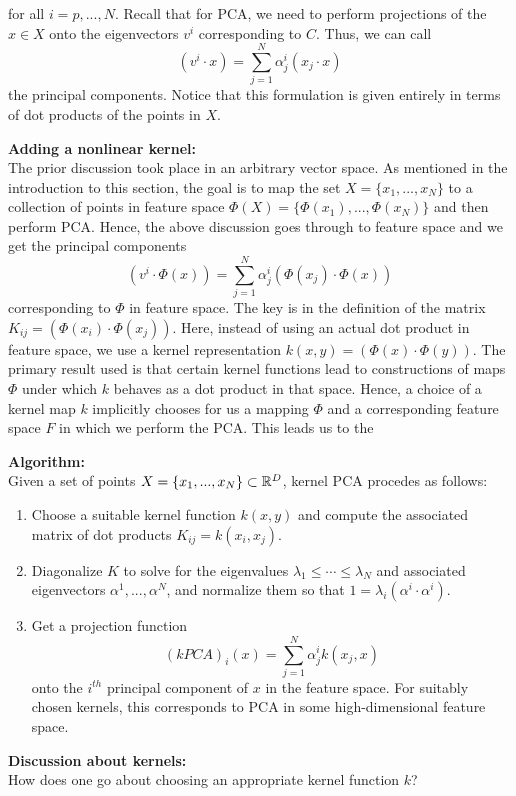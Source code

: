 \documentclass{gtpart}
\theoremstyle{definition}
\begin{document}
for all $i = p, ..., N$. Recall that for PCA, we need to perform projections of the $x \in X$ onto the eigenvectors $v^i$ corresponding to $C$. Thus, we can call $$(v^i \cdot x) = \sum_{j=1}^N \alpha_j^i(x_j \cdot x)$$ the principal components. Notice that this formulation is given entirely in terms of dot products of the points in $X$.

{\bf Adding a nonlinear kernel:}\\
The prior discussion took place in an arbitrary vector space. As mentioned in the introduction to this section, the goal is to map the set $X = \{x_1, ..., x_N\}$ to a collection of points in feature space $\Phi(X) = \{\Phi(x_1), ..., \Phi(x_N)\}$ and then perform PCA. Hence, the above discussion goes through to feature space and we get the principal components $$(v^i \cdot \Phi(x)) = \sum_{j=1}^N \alpha_j^i(\Phi(x_j) \cdot \Phi(x))$$ corresponding to $\Phi$ in feature space. The key is in the definition of the matrix $K_{ij} = (\Phi(x_i) \cdot \Phi(x_j))$. Here, instead of using an actual dot product in feature space, we use a kernel representation $k(x, y) = (\Phi(x) \cdot \Phi(y))$. The primary result used is that certain kernel functions lead to constructions of maps $\Phi$ under which $k$ behaves as a dot product in that space. Hence, a choice of a kernel map $k$ implicitly chooses for us a mapping $\Phi$ and a corresponding feature space $F$ in which we perform the PCA. This leads us to the

{\bf Algorithm:}\\
Given a set of points $X = \{x_1, ..., x_N\} \subset \mathbb{R}^D$, kernel PCA procedes as follows:
\begin{enumerate}[1.]
\item Choose a suitable kernel function $k(x, y)$ and compute the associated matrix of dot products $K_{ij} = k(x_i, x_j)$.
\item Diagonalize $K$ to solve for the eigenvalues $\lambda_1 \leq \cdots \leq \lambda_N$ and associated eigenvectors $\alpha^1, ..., \alpha^N$, and normalize them so that $1 = \lambda_i(\alpha^i \cdot \alpha^i)$.
\item Get a projection function $$(kPCA)_i(x) = \sum_{j=1}^N \alpha_j^i k(x_j, x)$$ onto the $i^{th}$ principal component of $x$ in the feature space. For suitably chosen kernels, this corresponds to PCA in some high-dimensional feature space.
\end{enumerate}

{\bf Discussion about kernels:}\\
How does one go about choosing an appropriate kernel function $k$? 
\end{document}
